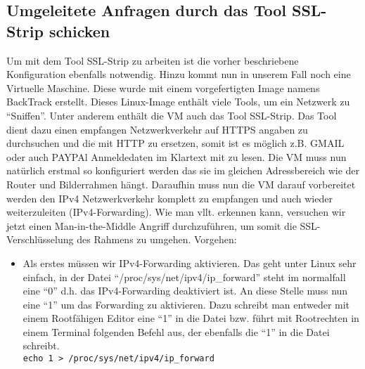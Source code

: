 \begin{flushleft}
  \subsection{Umgeleitete Anfragen durch das Tool SSL-Strip schicken}
    Um mit dem Tool SSL-Strip zu arbeiten ist die vorher beschriebene Konfiguration ebenfalls notwendig. Hinzu kommt nun in unserem Fall noch eine Virtuelle Maschine. Diese wurde mit einem vorgefertigten Image namens BackTrack erstellt. Dieses Linux-Image enthält viele Tools, um ein Netzwerk zu ``Sniffen''. Unter anderem enthält die VM auch das Tool SSL-Strip. Das Tool dient dazu einen empfangen Netzwerkverkehr auf HTTPS angaben zu durchsuchen und die mit HTTP zu ersetzen, somit ist es möglich z.B. GMAIL oder auch PAYPAl Anmeldedaten im Klartext mit zu lesen. Die VM muss nun natürlich erstmal so konfiguriert werden das sie im gleichen Adressbereich wie der Router und Bilderrahmen hängt. Daraufhin muss nun die VM darauf vorbereitet werden den IPv4 Netzwerkverkehr komplett zu empfangen und auch wieder weiterzuleiten (IPv4-Forwarding). Wie man vllt. erkennen kann, versuchen wir jetzt einen Man-in-the-Middle Angriff durchzuführen, um somit die SSL-Verschlüsselung des Rahmens zu umgehen.
    Vorgehen:\\
    \begin{itemize}
    \item Als erstes müssen wir IPv4-Forwarding aktivieren. Das geht unter Linux sehr einfach, in der Datei ``/proc/sys/net/ipv4/ip\_forward'' steht im normalfall eine ``0'' d.h. das IPv4-Forwarding deaktiviert ist. An diese Stelle muss nun eine ``1'' um das Forwarding zu aktivieren. Dazu schreibt man entweder mit einem Rootfähigen Editor eine ``1'' in die Datei bzw. führt mit Rootrechten in einem Terminal folgenden Befehl aus, der ebenfalls die ``1'' in die Datei schreibt.\\\vspace{.3cm}
    \verb+echo 1 > /proc/sys/net/ipv4/ip_forward+
    \end{itemize}


\end{flushleft}
